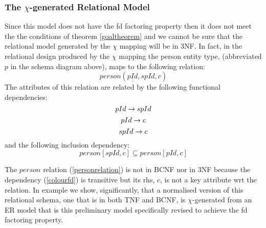 \subsubsection{The $\chi$-generated Relational Model}
Since this model does not have the fd factoring property then it does not meet the the conditions of theorem \ref{goaltheorem} and  we cannot be sure that the relational model generated by the $\chi$ mapping will  be in 3NF.
In fact, in the relational design produced by the $\chi$ mapping the person entity type, (abbreviated $p$ in the schema diagram above), maps to the following relation:
\begin{equation}
\label{personrelation}
person(\underline{pId}, spId, c)
\end{equation}
The  attributes of this relation are related by the following  functional dependencies:
\begin{equation}
\label{spIdfd}
pId \rightarrow spId
\end{equation}
\begin{equation}
\label{colourfd}
pId \rightarrow c
\end{equation}
\begin{equation}
\label{spIdcfd}
spId \rightarrow c
\end{equation}
and the following  inclusion dependency:
\begin{equation}
\label{spIdcolour1}
person[spId,c] \subseteq person[pId,c]
\end{equation}

The $person$ relation (\ref{personrelation}) is not in BCNF nor in 3NF because the dependency (\ref{colourfd}) is transitive but its rhs, $c$, is not a key attribute wrt the relation. 
In example  we show, significantly,  that a normalised version of this relational schema, one that is in both TNF and BCNF, is 
$\chi$-generated from an ER model that is this preliminary model specifically revised to achieve the fd factoring property. 




